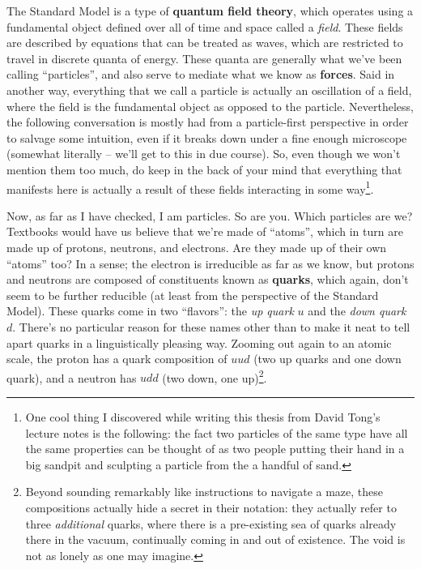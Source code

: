 \documentclass[
  11pt,
  numbers=noendperiod]{book}
\begin{document}
The Standard Model is a type of \textbf{quantum field theory}, which
operates using a fundamental object defined over all of time and space
called a \emph{field}. These fields are described by equations that can
be treated as waves, which are restricted to travel in discrete quanta
of energy. These quanta are generally what we've been calling
``particles'', and also serve to mediate what we know as
\textbf{forces}. Said in another way, everything that we call a particle
is actually an oscillation of a field, where the field is the
fundamental object as opposed to the particle. Nevertheless, the
following conversation is mostly had from a particle-first perspective
in order to salvage some intuition, even if it breaks down under a fine
enough microscope (somewhat literally -- we'll get to this in due
course). So, even though we won't mention them too much, do keep in the
back of your mind that everything that manifests here is actually a
result of these fields interacting in some way\footnote{One cool thing I
  discovered while writing this thesis from David Tong's lecture notes
  is the following: the fact two particles of the same type have all the
  same properties can be thought of as two people putting their hand in
  a big sandpit and sculpting a particle from the a handful of sand.}.

Now, as far as I have checked, I am particles. So are you. Which
particles are we? Textbooks would have us believe that we're made of
``atoms'', which in turn are made up of protons, neutrons, and
electrons. Are they made up of their own ``atoms'' too? In a sense; the
electron is irreducible as far as we know, but protons and neutrons are
composed of constituents known as \textbf{quarks}, which again, don't
seem to be further reducible (at least from the perspective of the
Standard Model). These quarks come in two ``flavors'': the \emph{up
quark} \(u\) and the \emph{down quark} \(d\). There's no particular
reason for these names other than to make it neat to tell apart quarks
in a linguistically pleasing way. Zooming out again to an atomic scale,
the proton has a quark composition of \(uud\) (two up quarks and one
down quark), and a neutron has \(udd\) (two down, one up)\footnote{Beyond
  sounding remarkably like instructions to navigate a maze, these
  compositions actually hide a secret in their notation: they actually
  refer to three \emph{additional} quarks, where there is a pre-existing
  sea of quarks already there in the vacuum, continually coming in and
  out of existence. The void is not as lonely as one may imagine.}.
\end{document}
